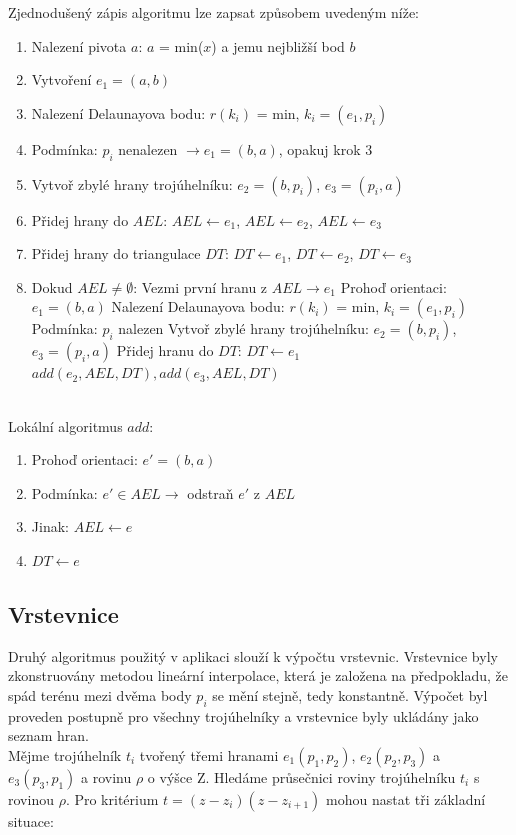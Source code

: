 \documentclass[a4paper, 12pt]{article}
\begin{document}
Zjednodušený zápis algoritmu lze zapsat způsobem uvedeným níže:

\begin{enumerate}
\item Nalezení pivota $a$: $a$ = min($x$) a jemu nejbližší bod $b$
\item Vytvoření $e_1 = (a,b)$
\item Nalezení Delaunayova bodu: $r(k_i)$ = min, $k_i = (e_1,p_i)$
\item Podmínka: $p_i$ nenalezen $\rightarrow e_1 = (b,a)$, opakuj krok 3
\item Vytvoř zbylé hrany trojúhelníku: $e_2 = (b,p_i)$, $e_3 = (p_i,a)$
\item Přidej hrany do $AEL$: $AEL \leftarrow e_1$, $AEL \leftarrow e_2$, $AEL \leftarrow e_3$
\item Přidej hrany do triangulace $DT$: $DT \leftarrow e_1$, $DT \leftarrow e_2$, $DT \leftarrow e_3$
\item Dokud $AEL \neq \emptyset$:
\subitem Vezmi první hranu z $AEL \rightarrow e_1$
\subitem Prohoď orientaci: $e_1 = (b,a)$
\subitem Nalezení Delaunayova bodu: $r(k_i)$ = min, $k_i = (e_1,p_i)$
\subitem Podmínka: $p_i$ nalezen 
\subsubitem Vytvoř zbylé hrany trojúhelníku: $e_2 = (b,p_i)$, $e_3 = (p_i,a)$
\subsubitem Přidej hranu do $DT$: $DT \leftarrow e_1$
\subsubitem $add(e_2,AEL,DT), add(e_3,AEL,DT)$
\end{enumerate}
~\\
Lokální algoritmus $add$:
\begin{enumerate}
\item Prohoď orientaci: $e' = (b,a)$
\item Podmínka: $e' \in AEL \rightarrow$ odstraň $e'$ z $AEL$
\item Jinak: $AEL \leftarrow e$  
\item $DT \leftarrow e$
\end{enumerate}

\subsection{Vrstevnice}
Druhý algoritmus použitý v aplikaci slouží k výpočtu vrstevnic. Vrstevnice byly zkonstruovány metodou lineární interpolace, která je založena na předpokladu, že spád terénu mezi dvěma body $p_i$ se mění stejně, tedy konstantně. Výpočet byl proveden postupně pro všechny trojúhelníky a vrstevnice byly ukládány jako seznam hran.\\

Mějme trojúhelník $t_i$ tvořený třemi hranami $e_{1}(p_{1},p_{2})$, $e_{2}(p_{2},p_{3})$ a $e_{3}(p_{3},p_{1})$ a rovinu $\rho$ o výšce Z. Hledáme průsečnici roviny trojúhelníku $t_i$ s rovinou $\rho$. Pro kritérium $t=(z-z_i)(z-z_{i+1})$ mohou nastat tři základní situace:
\end{document}
